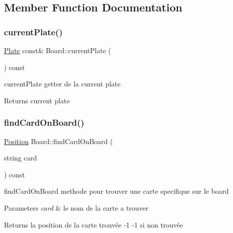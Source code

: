 \subsection{Member Function Documentation}
\mbox{\label{class_board_a63efb6f8c174f08251b2f5d4213d6358}} 
\subsubsection{\texorpdfstring{currentPlate()}{currentPlate()}}
{\footnotesize\ttfamily \mbox{\hyperlink{class_plate}{Plate}} const\& Board\+::current\+Plate (\begin{DoxyParamCaption}{ }\end{DoxyParamCaption}) const\hspace{0.3cm}{\ttfamily [inline]}}



current\+Plate getter de la current plate 

\begin{DoxyReturn}{Returns}
current plate 
\end{DoxyReturn}
\mbox{\label{class_board_a9585278deb40615be54520d8de432c21}} 
\subsubsection{\texorpdfstring{findCardOnBoard()}{findCardOnBoard()}}
{\footnotesize\ttfamily \mbox{\hyperlink{class_position}{Position}} Board\+::find\+Card\+On\+Board (\begin{DoxyParamCaption}\item[{string}]{card }\end{DoxyParamCaption}) const}



find\+Card\+On\+Board methode pour trouver une carte specifique sur le board 


\begin{DoxyParams}{Parameters}
{\em card} & le nom de la carte a trouver \\
\hline
\end{DoxyParams}
\begin{DoxyReturn}{Returns}
la position de la carte trouvée -\/1 -\/1 si non trouvée 
\end{DoxyReturn}
\mbox{\label{class_board_a3945b0c050763ec67df84b980b2f3aee}} 
